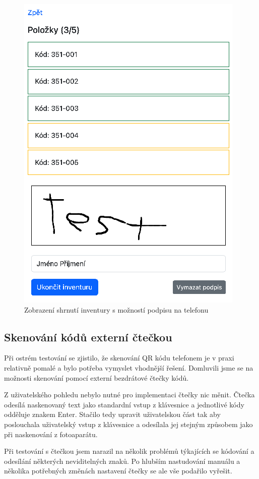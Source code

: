 \begin{figure}
    \centering
    \includegraphics[width=0.5\linewidth]{interaktivni-inventura-podpis.png}
    \caption{Zobrazení shrnutí inventury s možností podpisu na telefonu}
    \label{fig:enter-label}
\end{figure}


\subsection{Skenování kódů externí čtečkou}

Při ostrém testování se zjistilo, že skenování QR kódu telefonem je v praxi relativně pomalé a bylo potřeba vymyslet vhodnější řešení. Domluvili jsme se na možnosti skenování pomocí externí bezdrátové čtečky kódů.

Z uživatelského pohledu nebylo nutné pro implementaci čtečky nic měnit. Čtečka odesílá naskenovaný text jako standardní vstup z klávesnice a jednotlivé kódy odděluje znakem Enter. Stačilo tedy upravit uživatelskou část tak aby poslouchala uživatelský vstup z klávesnice a odesílala jej stejným způsobem jako při naskenování z fotoaparátu.

Při testování s čtečkou jsem narazil na několik problémů týkajících se kódování a odesílání některých neviditelných znaků. Po hlubším nastudování manuálu a několika potřebných změnách nastavení čtečky se ale vše podařilo vyřešit.


